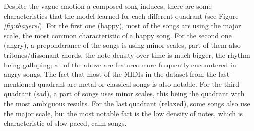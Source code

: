 Despite the vague emotion a composed song induces,
there are some characteristics that the model learned for each different quadrant
(see Figure \emph{\ref{fig:thayers}}).
For the first one (happy), most of the songs are using the major scale,
the most common characteristic of a happy song.
For the second one (angry), a preponderance of the songs is using minor scales,
part of them also tritones/dissonant chords,
the note density over time is much bigger,
the rhythm being galloping;
all of the above are features more frequently encountered in angry songs.
The fact that most of the MIDIs in the dataset from the last-mentioned quadrant
are metal or classical songs is also notable.
For the third quadrant (sad), a part of songs uses minor scales,
this being the quadrant with the most ambiguous results.
For the last quadrant (relaxed), some songs also use the major scale,
but the most notable fact is the low density of notes,
which is characteristic of slow-paced, calm songs.


